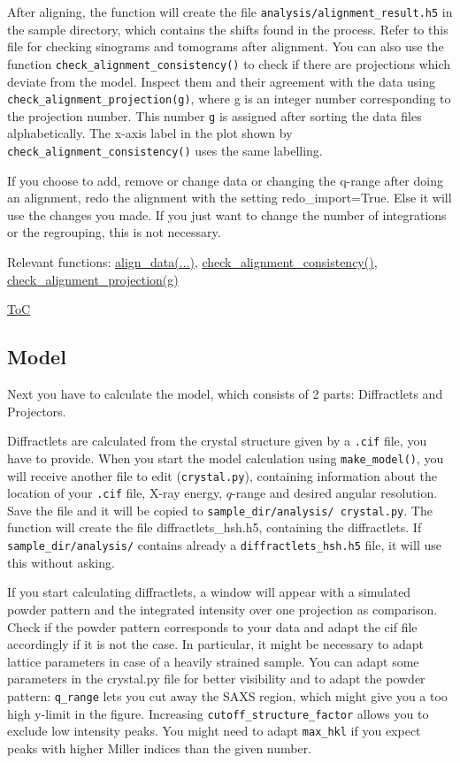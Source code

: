 After aligning, the function will create the file \texttt{analysis/alignment\_result.h5} in the sample directory, which contains the shifts found
in the process. Refer to this file for checking sinograms and tomograms after alignment.
You can also use the function \texttt{check\_alignment\_consistency()} to check if there are projections which deviate from the
model. Inspect them and their agreement with the data using \texttt{check\_alignment\_projection(g)}, where g is an integer number
corresponding to the projection number. This number \texttt{g} is assigned after sorting the data files alphabetically.
The x-axis label in the plot shown by \texttt{check\_alignment\_consistency()} uses the same labelling.

If you choose to add, remove or change data or changing the q-range after doing an alignment, redo the alignment with the
setting redo\_import=True.
Else it will use the changes you made. If you just want to change the number of integrations or the regrouping,
this is not necessary.

Relevant functions:
\hyperref[fun:aligndata]{align\_data(...)}, 
\hyperref[fun:checkalignmentconsistency]{check\_alignment\_consistency()},
\hyperref[fun:checkalignmentprojection]{check\_alignment\_projection(g)}

\begin{flushright}
    \hyperref[toc]{ToC}
\end{flushright}

\subsection{Model}
Next you have to calculate the model, which consists of 2 parts: Diffractlets and Projectors.

Diffractlets are calculated from the crystal structure given by a \texttt{.cif} file, you have to provide.
When you start the model calculation using \texttt{make\_model()}, you will receive another file to edit (\texttt{crystal.py}), containing
information about the location of your \texttt{.cif} file, X-ray energy, $q$-range and desired angular resolution.
Save the file and it will be copied to \texttt{sample\_dir/analysis/ crystal.py}.
The function will create the file diffractlets\_hsh.h5, containing the diffractlets. 
If \texttt{sample\_dir/analysis/} contains already a \texttt{diffractlets\_hsh.h5} file, it will use this without asking.

If you start calculating diffractlets, a window will appear with a simulated powder pattern and the integrated intensity
over one projection as comparison. Check if the powder pattern corresponds to your data and adapt the cif file accordingly
if it is not the case. In particular, it might be necessary to adapt lattice parameters in case of a heavily strained sample.
You can adapt some parameters in the crystal.py file for better visibility and to adapt the powder pattern:
\texttt{q\_range} lets you cut away the SAXS region, which might give you a too high y-limit in the figure.
Increasing \texttt{cutoff\_structure\_factor} allows you to exclude low intensity peaks.
You might need to adapt \texttt{max\_hkl} if you expect peaks with higher Miller indices than the given number.

